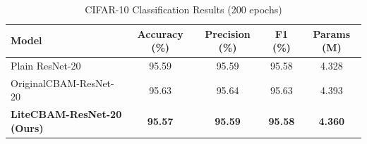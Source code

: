 \begin{table}[ht]
\centering
\caption{CIFAR-10 Classification Results (200 epochs)}
\label{tab:cifar10_results}
\begin{tabular}{lcccc}
\toprule
\textbf{Model} & \textbf{Accuracy (\%)} & \textbf{Precision (\%)} & \textbf{F1 (\%)} & \textbf{Params (M)} \\
\midrule
Plain ResNet-20 & 95.59 & 95.59 & 95.58 & 4.328 \\
OriginalCBAM-ResNet-20 & 95.63 & 95.64 & 95.63 & 4.393 \\
\textbf{LiteCBAM-ResNet-20 (Ours)} & \textbf{95.57} & \textbf{95.59} & \textbf{95.58} & \textbf{4.360} \\
\bottomrule
\end{tabular}
\end{table}
